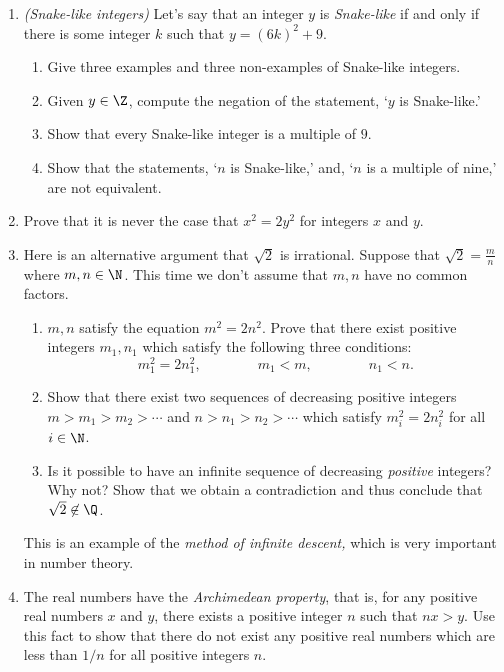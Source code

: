 \begin{enumerate}
	
  \item \emph{(Snake-like integers)} Let's say that an integer $y$ is \textit{Snake-like} if and only if there is some integer $k$ such that $y=(6k)^2+9$.
	\begin{enumerate}
	  \item Give three examples and three non-examples of Snake-like integers. 
	  \item Given $y\in\Z$, compute the negation of the statement, `$y$ is Snake-like.'
	  \item Show that every Snake-like integer is a multiple of $9$.
	  \item Show that the statements, `$n$ is Snake-like,' and, `$n$ is a multiple of nine,' are not equivalent.
	\end{enumerate}
	
    \item Prove that it is never the case that $x^2 = 2y^2$ for integers $x$ and $y$.
  
  \item Here is an alternative argument that $\sqrt 2$ is irrational. Suppose that $\sqrt 2=\frac mn$ where $m,n\in\N$. This time we don't assume that $m,n$ have no common factors.
  \begin{enumerate}
    \item $m,n$ satisfy the equation $m^2=2n^2$. Prove that there exist positive integers $m_1,n_1$ which satisfy the following three conditions:
    \[m_1^2=2n_1^2,\qquad\qquad m_1<m,\qquad\qquad n_1<n.\] 
    \item Show that there exist two sequences of decreasing positive integers $m>m_1>m_2>\cdots$ and $n>n_1>n_2>\cdots$ which satisfy $m_i^2=2n_i^2$ for all $i\in\N$.
    \item Is it possible to have an infinite sequence of decreasing \emph{positive} integers? Why not? Show that we obtain a contradiction and thus conclude that $\sqrt 2\not\in\Q$.
	\end{enumerate}
	This is an example of the \emph{method of infinite descent,} which is very important in number theory. 
	
		\item The real numbers have the \emph{Archimedean property}, that is, for any positive real numbers $x$ and $y$, there exists a positive integer $n$ such that $nx > y$. Use this fact to show that there do not exist any positive real numbers which are less than $1/n$ for all positive integers $n$. 
  

\end{enumerate}
